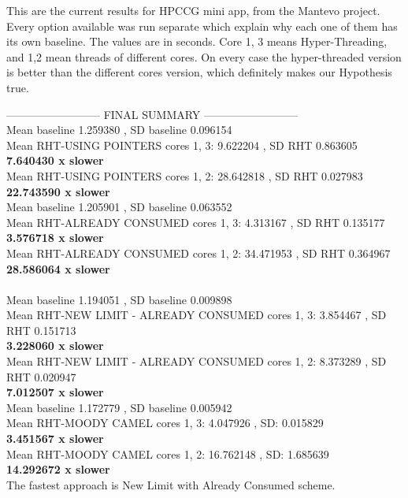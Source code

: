 This are the current results for HPCCG mini app, from the Mantevo project. Every option available was run separate which explain why each one of them has its own baseline. The values are in seconds. Core 1, 3 means Hyper-Threading, and 1,2 mean threads of different cores. On every case the hyper-threaded version is better than the different cores version, which definitely makes our Hypothesis true.

-------------------------- FINAL SUMMARY --------------------------\\
Mean baseline 1.259380 , SD baseline 0.096154 \\
Mean RHT-USING POINTERS cores 1, 3: 9.622204 , SD RHT 0.863605\\
\textbf{7.640430 x slower} \\
Mean RHT-USING POINTERS cores 1, 2: 28.642818 , SD RHT 0.027983 \\
\textbf{22.743590 x slower} \\

Mean baseline 1.205901 , SD baseline 0.063552 \\
Mean RHT-ALREADY CONSUMED cores 1, 3: 4.313167 , SD RHT 0.135177\\
\textbf{3.576718 x slower} \\
Mean RHT-ALREADY CONSUMED  cores 1, 2: 34.471953 , SD RHT 0.364967\\
\textbf{28.586064 x slower} \\\\

Mean baseline 1.194051 , SD baseline 0.009898 \\
Mean RHT-NEW LIMIT - ALREADY CONSUMED cores 1, 3: 3.854467 , SD RHT 0.151713\\
\textbf{3.228060 x slower} \\
Mean RHT-NEW LIMIT - ALREADY CONSUMED cores 1, 2: 8.373289 , SD RHT 0.020947\\
\textbf{7.012507 x slower} \\

Mean baseline 1.172779 , SD baseline 0.005942 \\
Mean RHT-MOODY CAMEL cores 1, 3: 4.047926 , SD: 0.015829\\
\textbf{3.451567 x slower} \\
Mean RHT-MOODY CAMEL cores 1, 2: 16.762148 , SD: 1.685639\\
\textbf{14.292672 x slower} \\

The fastest approach is New Limit with Already Consumed scheme.

